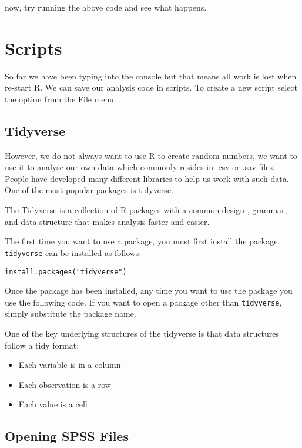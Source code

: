 \documentclass[]{book}
\providecommand{\tightlist}{%
  \setlength{\itemsep}{0pt}\setlength{\parskip}{0pt}}
\begin{document}
now, try running the above code and see what happens.

\hypertarget{scripts}{%
\section{Scripts}\label{scripts}}

So far we have been typing into the console but that means all work is lost when re-start R. We can save our analysis code in scripts. To create a new script select the option from the File menu.

\hypertarget{tidyverse}{%
\subsection{Tidyverse}\label{tidyverse}}

However, we do not always want to use R to create random numbers, we want to use it to analyse our own data which commonly resides in .csv or .sav files. People have developed many different libraries to help us work with such data. One of the most popular packages is tidyverse.

The Tidyverse is a collection of R packages with a common design , grammar, and data structure that makes analysis faster and easier.

The first time you want to use a package, you must first install the package. \texttt{tidyverse} can be installed as follows.

\begin{verbatim}
install.packages("tidyverse")
\end{verbatim}

Once the package has been installed, any time you want to use the package you use the following code. If you want to open a package other than \texttt{tidyverse}, simply substitute the package name.

One of the key underlying structures of the tidyverse is that data structures follow a tidy format:

\begin{itemize}
\tightlist
\item
  Each variable is in a column
\item
  Each observation is a row
\item
  Each value is a cell
\end{itemize}

\hypertarget{opening-spss-files}{%
\subsection{Opening SPSS Files}\label{opening-spss-files}}
\end{document}
